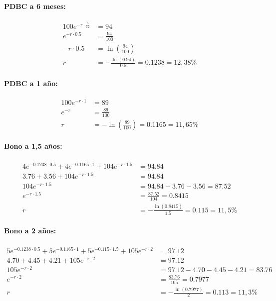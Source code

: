 \documentclass[12pt]{article}
\begin{document}
\paragraph{PDBC a 6 meses:}
\begin{align*}
100 e^{-r \cdot \frac{6}{12}} &= 94 \\
e^{-r \cdot 0.5} &= \frac{94}{100} \\
-r \cdot 0.5 &= \ln\left(\frac{94}{100}\right) \\
r &= -\frac{\ln(0.94)}{0.5} = 0.1238 = 12{,}38\%
\end{align*}

\paragraph{PDBC a 1 año:}
\begin{align*}
100 e^{-r \cdot 1} &= 89 \\
e^{-r} &= \frac{89}{100} \\
r &= -\ln\left(\frac{89}{100}\right) = 0.1165 = 11{,}65\%
\end{align*}

\paragraph{Bono a 1{,}5 años:}
\begin{align*}
4 e^{-0.1238 \cdot 0.5} + 4 e^{-0.1165 \cdot 1} + 104 e^{-r \cdot 1.5} &= 94.84 \\
3.76 + 3.56 + 104 e^{-r \cdot 1.5} &= 94.84 \\
104 e^{-r \cdot 1.5} &= 94.84 - 3.76 - 3.56 = 87.52 \\
e^{-r \cdot 1.5} &= \frac{87.52}{104} = 0.8415 \\
r &= -\frac{\ln(0.8415)}{1.5} = 0.115 = 11{,}5\%
\end{align*}

\paragraph{Bono a 2 años:}
\begin{align*}
5 e^{-0.1238 \cdot 0.5} + 5 e^{-0.1165 \cdot 1} + 5 e^{-0.115 \cdot 1.5} + 105 e^{-r \cdot 2} &= 97.12 \\
4.70 + 4.45 + 4.21 + 105 e^{-r \cdot 2} &= 97.12 \\
105 e^{-r \cdot 2} &= 97.12 - 4.70 - 4.45 - 4.21 = 83.76 \\
e^{-r \cdot 2} &= \frac{83.76}{105} = 0.7977 \\
r &= -\frac{\ln(0.7977)}{2} = 0.113 = 11{,}3\%
\end{align*}
\end{document}
